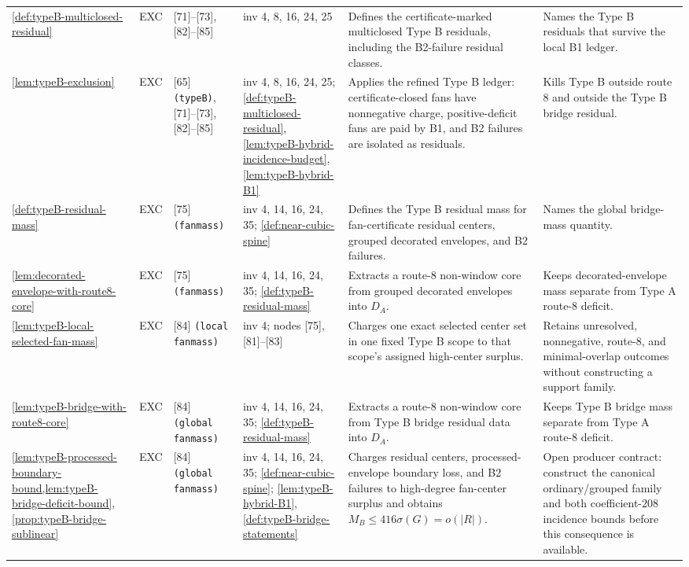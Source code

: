 \documentclass[11pt]{article}
\begin{document}
{\begin{longtable}{L{0.10\textwidth} C{0.045\textwidth} L{0.13\textwidth} L{0.135\textwidth} L{0.28\textwidth} L{0.20\textwidth}}
\cref{def:typeB-multiclosed-residual} & EXC & [71]--[73], [82]--[85] & inv 4, 8, 16, 24, 25 & Defines the certificate-marked multiclosed Type B residuals, including the B2-failure residual classes. & Names the Type B residuals that survive the local B1 ledger. \\
\cref{lem:typeB-exclusion} & EXC & [65] \texttt{(typeB)}, [71]--[73], [82]--[85] & inv 4, 8, 16, 24, 25; \cref{def:typeB-multiclosed-residual}, \cref{lem:typeB-hybrid-incidence-budget}, \cref{lem:typeB-hybrid-B1} & Applies the refined Type B ledger: certificate-closed fans have nonnegative charge, positive-deficit fans are paid by B1, and B2 failures are isolated as residuals. & Kills Type B outside route 8 and outside the Type B bridge residual. \\
\cref{def:typeB-residual-mass} & EXC & [75] \texttt{(fanmass)} & inv 4, 14, 16, 24, 35; \cref{def:near-cubic-spine} & Defines the Type B residual mass for fan-certificate residual centers, grouped decorated envelopes, and B2 failures. & Names the global bridge-mass quantity. \\
\cref{lem:decorated-envelope-with-route8-core} & EXC & [75] \texttt{(fanmass)} & inv 4, 14, 16, 24, 35; \cref{def:typeB-residual-mass} & Extracts a route-8 non-window core from grouped decorated envelopes into \(D_A\). & Keeps decorated-envelope mass separate from Type A route-8 deficit. \\
\cref{lem:typeB-local-selected-fan-mass} & EXC & [84] \texttt{(local fanmass)} & inv 4; nodes [75], [81]--[83] & Charges one exact selected center set in one fixed Type B scope to that scope's assigned high-center surplus. & Retains unresolved, nonnegative, route-8, and minimal-overlap outcomes without constructing a support family. \\
\cref{lem:typeB-bridge-with-route8-core} & EXC & [84] \texttt{(global fanmass)} & inv 4, 14, 16, 24, 35; \cref{def:typeB-residual-mass} & Extracts a route-8 non-window core from Type B bridge residual data into \(D_A\). & Keeps Type B bridge mass separate from Type A route-8 deficit. \\
\cref{lem:typeB-processed-boundary-bound,lem:typeB-bridge-deficit-bound}, \cref{prop:typeB-bridge-sublinear} & EXC & [84] \texttt{(global fanmass)} & inv 4, 14, 16, 24, 35; \cref{def:near-cubic-spine}; \cref{lem:typeB-hybrid-B1}, \cref{def:typeB-bridge-statements} & Charges residual centers, processed-envelope boundary loss, and B2 failures to high-degree fan-center surplus and obtains \(M_B\le416\sigma(G)=o(|R|)\). & Open producer contract: construct the canonical ordinary/grouped family and both coefficient-\(208\) incidence bounds before this consequence is available. \\

\end{longtable}}
\end{document}

